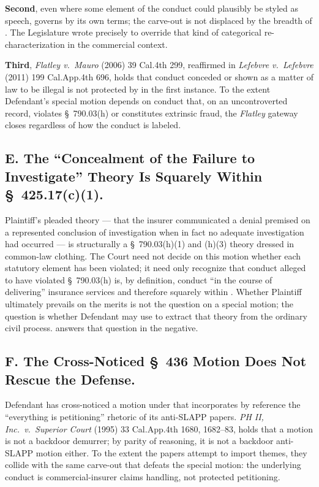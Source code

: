 \textbf{Second}, even where some element of the conduct could plausibly be styled as speech,  governs by its own terms; the carve-out is not displaced by the breadth of . The Legislature wrote  precisely to override that kind of categorical re-characterization in the commercial context.

\textbf{Third}, \textit{Flatley v.\ Mauro} (2006) 39 Cal.4th 299, reaffirmed in \textit{Lefebvre v.\ Lefebvre} (2011) 199 Cal.App.4th 696, holds that conduct conceded or shown as a matter of law to be illegal is not protected by  in the first instance. To the extent Defendant's special motion depends on conduct that, on an uncontroverted record, violates \S~790.03(h) or constitutes extrinsic fraud, the \textit{Flatley} gateway closes regardless of how the conduct is labeled.

\subsection*{E. The ``Concealment of the Failure to Investigate'' Theory Is Squarely Within \S~425.17(c)(1).}

Plaintiff's pleaded theory --- that the insurer communicated a denial premised on a represented conclusion of investigation when in fact no adequate investigation had occurred --- is structurally a \S~790.03(h)(1) and (h)(3) theory dressed in common-law clothing. The Court need not decide on this motion whether each statutory element has been violated; it need only recognize that conduct alleged to have violated \S~790.03(h) is, by definition, conduct ``in the course of delivering'' insurance services and therefore squarely within . Whether Plaintiff ultimately prevails on the merits is not the question on a  special motion; the question is whether Defendant may use  to extract that theory from the ordinary civil process.  answers that question in the negative.

\subsection*{F. The Cross-Noticed \S~436 Motion Does Not Rescue the Defense.}

Defendant has cross-noticed a motion under  that incorporates by reference the ``everything is petitioning'' rhetoric of its anti-SLAPP papers. \textit{PH II, Inc.\ v.\ Superior Court} (1995) 33 Cal.App.4th 1680, 1682--83, holds that a  motion is not a backdoor demurrer; by parity of reasoning, it is not a backdoor anti-SLAPP motion either. To the extent the  papers attempt to import  themes, they collide with the same  carve-out that defeats the special motion: the underlying conduct is commercial-insurer claims handling, not protected petitioning.

